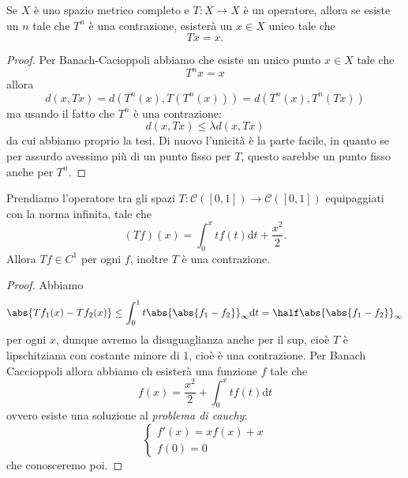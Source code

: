 \documentclass[11pt]{scrartcl}
\newcommand{\dif}{\text{d}}
\begin{document}
	\begin{corollary}
		Se $X$ è uno spazio metrico completo e $T:X\to X$ è un operatore, allora se esiste un $n$ tale che $T^n$ è una contrazione, esisterà un $x\in X$ unico tale che
		$$Tx=x.$$
	\end{corollary}
	\begin{proof}
		Per Banach-Cacioppoli abbiamo che esiste un unico punto $x\in X$ tale che
		$$T^nx=x$$
		allora 
		$$d(x,Tx)=d\left(T^n(x),T(T^n(x))\right)=d\left(T^n(x),T^n(Tx)\right)$$
		ma usando il fatto che $T^n$ è una contrazione:
		$$d(x,Tx)\le \lambda d\left(x,Tx\right)$$
		da cui abbiamo proprio la tesi. Di nuovo l'unicità è la parte facile, in quanto se per assurdo avessimo più di un punto fisso per $T$, questo sarebbe un punto fisso anche per $T^n$.
	\end{proof}
	\begin{example}
		Prendiamo l'operatore tra gli spazi $T:\mathcal{C}([0,1])\to\mathcal{C}([0,1])$ equipaggiati con la norma infinita, tale che 
		$$(Tf)(x)=\int_0^x tf(t)\dif t+\frac{x^2}{2}.$$
		Allora $Tf\in C^1$ per ogni $f$, inoltre $T$ è una contrazione. 
	\end{example}
	\begin{proof}
		Abbiamo 
		$$\abs{Tf_1(x)-Tf_2(x)}\le \int_0^1 t\abs{\abs{f_1-f_2}}_\infty \dif t=\half \abs{\abs{f_1-f_2}}_\infty$$
		per ogni $x$, dunque avremo la disuguaglianza anche per il sup, cioè $T$ è lipschitziana con costante minore di $1$, cioè è una contrazione. Per Banach Caccioppoli allora abbiamo ch esisterà una funzione $f$ tale che
		$$f(x)=\frac{x^2}{2}+\int_0^x tf(t)\dif t$$
		ovvero esiste una soluzione al \textit{problema di cauchy}:
		$$\begin{cases}
			f'(x)=xf(x)+x \\
			f(0)=0
		\end{cases}$$
		che conosceremo poi.
	\end{proof}
	
\end{document}
